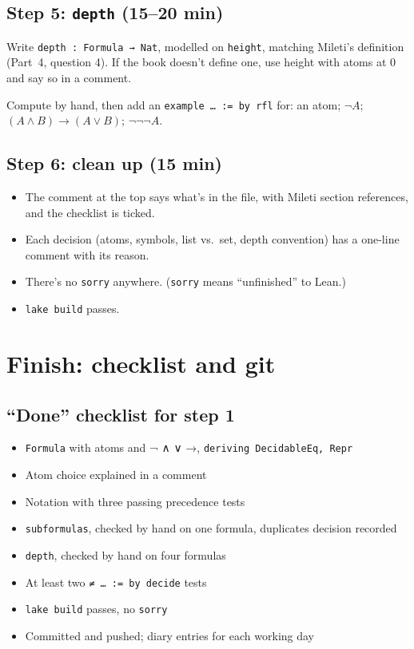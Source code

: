 \documentclass[11pt,a4paper]{article}
\newcommand{\code}[1]{\texttt{#1}}
\begin{document}
\subsection{Step 5: \texttt{depth} (15--20 min)}
Write \code{depth : Formula → Nat}, modelled on \code{height}, matching Mileti's definition (Part~4, question 4). If the book doesn't define one, use height with atoms at 0 and say so in a comment.
\begin{okbox}
Compute by hand, then add an \code{example … := by rfl} for: an atom; $\neg A$; $(A\wedge B)\to(A\vee B)$; $\neg\neg\neg A$.
\end{okbox}

\subsection{Step 6: clean up (15 min)}
\begin{itemize}
\item The comment at the top says what's in the file, with Mileti section references, and the checklist is ticked.
\item Each decision (atoms, symbols, list vs.\ set, depth convention) has a one-line comment with its reason.
\item There's no \code{sorry} anywhere. (\code{sorry} means ``unfinished'' to Lean.)
\item \code{lake build} passes.
\end{itemize}

\section{Finish: checklist and git}

\subsection{``Done'' checklist for step 1}
\begin{itemize}[label=□]
\item \code{Formula} with atoms and ¬ ∧ ∨ →, \code{deriving DecidableEq, Repr}
\item Atom choice explained in a comment
\item Notation with three passing precedence tests
\item \code{subformulas}, checked by hand on one formula, duplicates decision recorded
\item \code{depth}, checked by hand on four formulas
\item At least two \code{≠ … := by decide} tests
\item \code{lake build} passes, no \code{sorry}
\item Committed and pushed; diary entries for each working day
\end{itemize}
\end{document}
